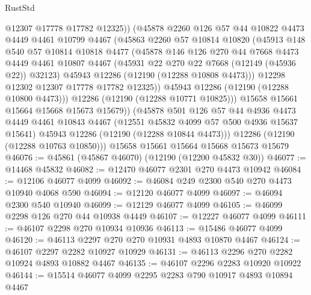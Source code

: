 \begin{lexlean}{RustStd}
\begin{coremodule}
                @12307
                @17778
                @17782
                @12325))
            (@45878
              @2260
              @126
              @57
              @44
              @10822
              @4473
              @4449
              @4461
              @10799
              @4467
              (@45863
                @2260
                @57
                @10814
                @10820
                (@45913
                  @148
                  @540
                  @57
                  @10814
                  @10818
                  @4477
                  (@45878
                    @146
                    @126
                    @270
                    @44
                    @7668
                    @4473
                    @4449
                    @4461
                    @10807
                    @4467
                    (@45931 @22 @270 @22 @7668 (@12149 (@45936 @22)) @32123)
                    @45943
                    @12286
                    (@12190 (@12288 @10808 @4473)))
                  @12298
                  @12302
                  @12307
                  @17778
                  @17782
                  @12325))
              @45943
              @12286
              (@12190 (@12288 @10800 @4473)))
            @12286
            (@12190 (@12288 @10771 @10825)))
          @15658
          @15661
          @15664
          @15668
          @15673
          @15679))
      (@45878
        @501
        @126
        @57
        @44
        @4936
        @4473
        @4449
        @4461
        @10843
        @4467
        (@12551 @45832 @4099 @57 @500 @4936 @15637 @15641)
        @45943
        @12286
        (@12190 (@12288 @10844 @4473)))
      @12286
      (@12190 (@12288 @10763 @10850)))
    @15658
    @15661
    @15664
    @15668
    @15673
    @15679
@46076 := @45861 (@45867 @46070) (@12190 (@12200 @45832 @30))
@46077 := @14468 @45832
@46082 := @12470 @46077 @2301 @270 @4473 @10942
@46084 := @12106 @46077 @4099
@46092 := @46084 @249 @2300 @540 @270 @4473 @10940 @4068 @590
@46094 := @12120 @46077 @4099
@46097 := @46094 @2300 @540 @10940
@46099 := @12129 @46077 @4099
@46105 := @46099 @2298 @126 @270 @44 @10938 @4449
@46107 := @12227 @46077 @4099
@46111 := @46107 @2298 @270 @10934 @10936
@46113 := @15486 @46077 @4099
@46120 := @46113 @2297 @270 @270 @10931 @4893 @10870 @4467
@46124 := @46107 @2297 @2282 @10927 @10929
@46131 := @46113 @2296 @270 @2282 @10924 @4893 @10882 @4467
@46135 := @46107 @2296 @2283 @10920 @10922
@46144 := @15514 @46077 @4099 @2295 @2283 @790 @10917 @4893 @10894 @4467

\end{coremodule}
\end{lexlean}
